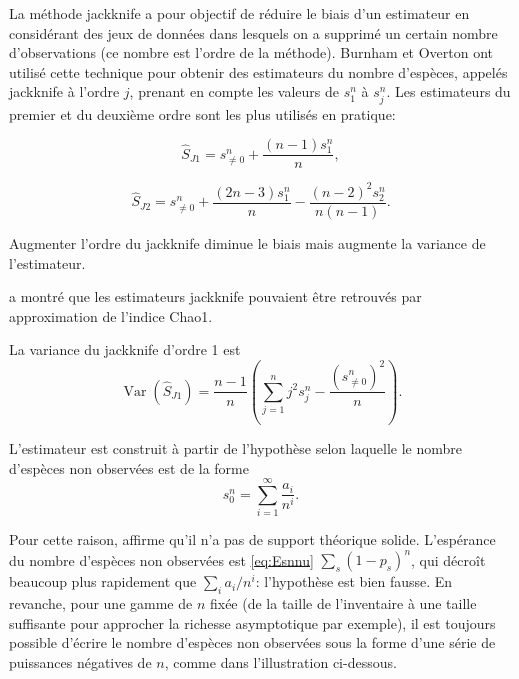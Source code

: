 \documentclass[
  11pt,
  french,
  a4paper,
  extrafontsizes,onecolumn,openright
  ]{memoir}
\begin{document}
La méthode jackknife a pour objectif de réduire le biais d'un estimateur en considérant des jeux de données dans lesquels on a supprimé un certain nombre d'observations (ce nombre est l'ordre de la méthode).
Burnham et Overton \autocite*{Burnham1978,Burnham1979} ont utilisé cette technique pour obtenir des estimateurs du nombre d'espèces, appelés jackknife à l'ordre \(j\), prenant en compte les valeurs de \(s^{n}_{1}\) à \(s^{n}_{j}\).
Les estimateurs du premier et du deuxième ordre sont les plus utilisés en pratique:

\begin{equation}
  \label{eq:Jack1}
  \hat{S}_\mathit{J1} = {s^{n}_{\ne 0}} + \frac{\left(n-1\right){s^{n}_{1}}}{n},
\end{equation}

\begin{equation} 
  \label{eq:Jack2}
  \hat{S}_\mathit{J2} = {s^{n}_{\ne 0}} + \frac{\left(2n-3\right){s^{n}_{1}}}{n} - \frac{{\left(n-2\right)}^{2}s^{n}_{2}}{n\left(n-1\right)}.
\end{equation}

Augmenter l'ordre du jackknife diminue le biais mais augmente la variance de l'estimateur.

\textcite{Chao1984} a montré que les estimateurs jackknife pouvaient être retrouvés par approximation de l'indice Chao1.

La variance du jackknife d'ordre 1 est \autocite{Heltshe1983}
\begin{equation} 
  \label{eq:VarJack1}
  \operatorname{Var}{\left( \hat{S}_\mathit{J1} \right)}
  = \frac{n-1}{n} \left( \sum_{j=1}^{n}{j^2 s^{n}_{j}} - \frac{\left( s^{n}_{\ne 0} \right)^2}{n} \right).
\end{equation}

L'estimateur est construit à partir de l'hypothèse selon laquelle le nombre d'espèces non observées est de la forme
\[s^{n}_{0} = \sum_{i=1}^{\infty}{\frac{a_i}{n^i}}.\]

Pour cette raison, \textcite{Cormack1989} affirme qu'il n'a pas de support théorique solide.
L'espérance du nombre d'espèces non observées est \eqref{eq:Esnnu} \(\sum_s{(1-p_s)^n}\), qui décroît beaucoup plus rapidement que \(\sum_{i}{{a_i}/{n^i}}\): l'hypothèse est bien fausse.
En revanche, pour une gamme de \(n\) fixée (de la taille de l'inventaire à une taille suffisante pour approcher la richesse asymptotique par exemple), il est toujours possible d'écrire le nombre d'espèces non observées sous la forme d'une série de puissances négatives de \(n\), comme dans l'illustration ci-dessous.
\end{document}
